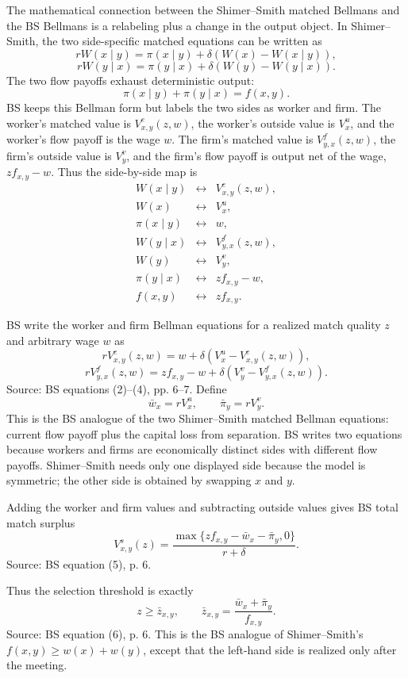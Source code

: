 ﻿\documentclass[11pt]{article}
\newcommand{\1}{\mathbf{1}}
\begin{document}
The mathematical connection between the Shimer--Smith matched Bellmans and the
BS Bellmans is a relabeling plus a change in the output object. In Shimer--Smith,
the two side-specific matched equations can be written as
\[
rW(x\mid y)
=
\pi(x\mid y)+\delta\left(W(x)-W(x\mid y)\right),
\tag{SS-x}
\]
\[
rW(y\mid x)
=
\pi(y\mid x)+\delta\left(W(y)-W(y\mid x)\right).
\tag{SS-y}
\]
The two flow payoffs exhaust deterministic output:
\[
\pi(x\mid y)+\pi(y\mid x)=f(x,y).
\]
BS keeps this Bellman form but labels the two sides as worker and firm. The
worker's matched value is $V^e_{x,y}(z,w)$, the worker's outside value is
$V_x^u$, and the worker's flow payoff is the wage $w$. The firm's matched value
is $V^f_{y,x}(z,w)$, the firm's outside value is $V_y^v$, and the firm's flow
payoff is output net of the wage, $zf_{x,y}-w$. Thus the side-by-side map is
\[
\begin{array}{ccl}
W(x\mid y) &\longleftrightarrow& V^e_{x,y}(z,w),\\
W(x) &\longleftrightarrow& V_x^u,\\
\pi(x\mid y) &\longleftrightarrow& w,\\
W(y\mid x) &\longleftrightarrow& V^f_{y,x}(z,w),\\
W(y) &\longleftrightarrow& V_y^v,\\
\pi(y\mid x) &\longleftrightarrow& zf_{x,y}-w,\\
f(x,y) &\longleftrightarrow& zf_{x,y}.
\end{array}
\]

BS write the worker and firm Bellman equations for a realized match quality
$z$ and arbitrary wage $w$ as
\[
rV^e_{x,y}(z,w)=w+\delta\left(V_x^u-V^e_{x,y}(z,w)\right),
\]
\[
rV^f_{y,x}(z,w)=z f_{x,y}-w+\delta\left(V_y^v-V^f_{y,x}(z,w)\right).
\]
Source: BS equations (2)--(4), pp. 6--7. Define
\[
\bar w_x=rV_x^u,\qquad \bar\pi_y=rV_y^v.
\]
This is the BS analogue of the two Shimer--Smith matched Bellman equations:
current flow payoff plus the capital loss from separation. BS writes two
equations because workers and firms are economically distinct sides with
different flow payoffs. Shimer--Smith needs only one displayed side because the
model is symmetric; the other side is obtained by swapping $x$ and $y$.

Adding the worker and firm values and subtracting outside values gives BS total
match surplus
\[
V^s_{x,y}(z)
=
\frac{\max\{z f_{x,y}-\bar w_x-\bar\pi_y,0\}}{r+\delta}.
\]
Source: BS equation (5), p. 6.

Thus the selection threshold is exactly
\[
z\geq \bar z_{x,y},
\qquad
\bar z_{x,y}
=
\frac{\bar w_x+\bar\pi_y}{f_{x,y}}.
\]
Source: BS equation (6), p. 6. This is the BS analogue of Shimer--Smith's
$f(x,y)\geq w(x)+w(y)$, except that the left-hand side is realized only after
the meeting.
\end{document}
